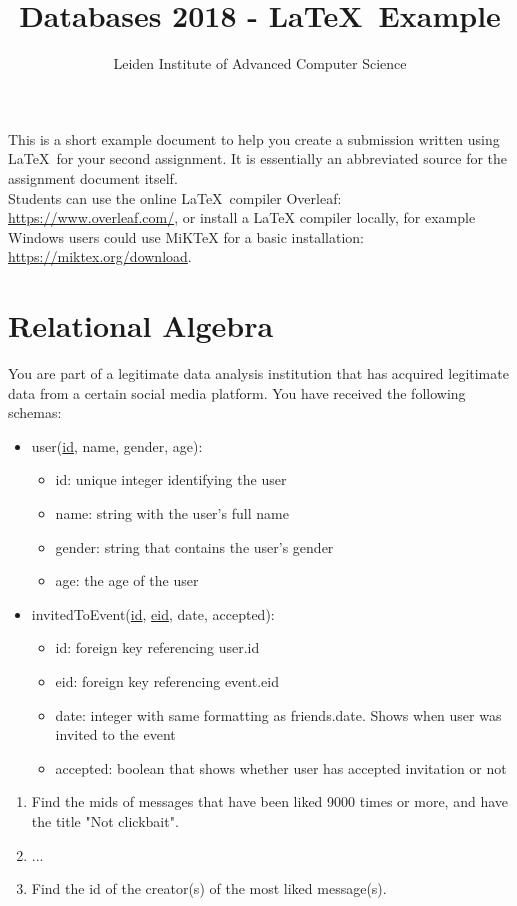 \documentclass{article}
\title{Databases 2018 - \LaTeX\ Example}
\author{Leiden Institute of Advanced Computer Science}
\begin{document}
\maketitle %
This is a short example document to help you create a submission written using \LaTeX\ for your second assignment. It is essentially an abbreviated source for the assignment document itself. \\

Students can use the online \LaTeX\ compiler Overleaf: \url{https://www.overleaf.com/}, or install a LaTeX compiler locally, for example Windows users could use MiKTeX for a basic installation: \url{https://miktex.org/download}. 

\section{Relational Algebra}
You are part of a legitimate data analysis institution that has acquired legitimate data from a certain social media platform. You have received the following schemas:
\begin{itemize}
	\item user(\underline{id}, name, gender, age):
		\begin{itemize}
		\item id: unique integer identifying the user
		\item name: string with the user's full name
		\item gender: string that contains the user's gender
		\item age: the age of the user
		\end{itemize}
	\item invitedToEvent(\underline{id}, \underline{eid}, date, accepted):
		\begin{itemize}
		\item id: foreign key referencing user.id
		\item eid: foreign key referencing event.eid
		\item date: integer with same formatting as friends.date. Shows when user was invited to the event
		\item accepted: boolean that shows whether user has accepted invitation or not
		\end{itemize}
\end{itemize}

\begin{enumerate}
	\item Find the mids of messages that have been liked 9000 times or more, and have the title "Not clickbait".
	\item ...
	\item Find the id of the creator(s) of the most liked message(s).
\end{enumerate}
\end{document}
